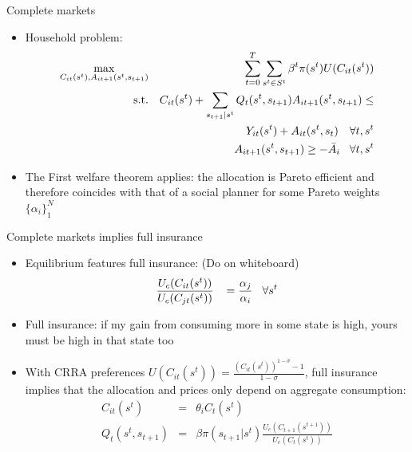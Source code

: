 \documentclass[9pt]{beamer}
\newcommand{\bit}{\begin{itemize}}
\newcommand{\eit}{\end{itemize}}
\newcommand{\bc}{\color{blue}}
\newcommand{\rc}{\color{red}}
\begin{document}
\begin{frame}{Complete markets}

\bit
\setlength\itemsep{1em}

\item Household problem:
\begin{eqnarray}
\max_{C_{it}(s^t), A_{it+1}(s^t, s_{t+1})} && \sum_{t=0}^{T} \sum_{s^t \in S^t} \beta^t \pi (s^t) U(C_{it}(s^t)) \nonumber \\
\text{s.t.} && 	C_{it}(s^t) + \sum_{s_{t+1}|s^t} Q_t(s^t, s_{t+1}) A_{it+1}(s^t, s_{t+1}) \leq \nonumber \\
&& Y_{it}(s^t) + A_{it}(s^t, s_t) \quad \forall t, s^{t}\nonumber \\
&& A_{it+1}(s^t, s_{t+1}) \geq - \bar A_i \hspace{3mm} \forall t, s^{t}\nonumber
\end{eqnarray}

\item The {\bc First welfare theorem} applies: the allocation is Pareto efficient and therefore coincides with that of a social planner for some Pareto weights $\{\alpha_i\}_{1}^{N}$


\eit

\end{frame}


\begin{frame}{Complete markets implies full insurance}

\bit
\setlength\itemsep{1em}

\item Equilibrium features {\bc full insurance}: {\rc (Do on whiteboard)}
\begin{eqnarray}
\frac{U_c(C_{it}(s^t))}{U_c(C_{jt}(s^t))} \hspace{3mm} = \frac{\alpha_j}{\alpha_i} \hspace{3mm} \forall s^t \nonumber
\end{eqnarray}


\item Full insurance: if my gain from consuming more in some state is high, yours must be high in that state too

\item With CRRA preferences $U(C_{it}(s^t)) = \frac{(C_{it}(s^t))^{1-\sigma}-1}{1-\sigma}$, full insurance implies that the allocation and prices only depend on aggregate consumption:
\begin{eqnarray}
C_{it}(s^t) &=& \theta_i C_{t}(s^t) \nonumber \\
Q_t(s^t, s_{t+1}) &=& \beta \pi(s_{t+1} | s^t) \frac{U_c(C_{t+1}(s^{t+1}))}{U_c(C_{t}(s^t))} \nonumber
\end{eqnarray}

\eit

\end{frame}
\end{document}
